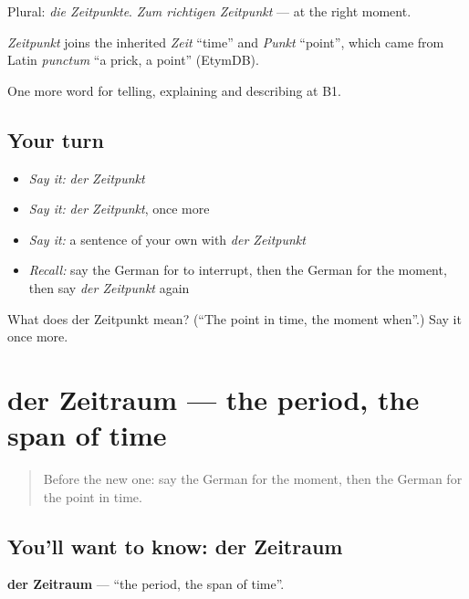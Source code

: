 Plural: \emph{die Zeitpunkte}. \emph{Zum richtigen Zeitpunkt} — at the right moment.

\begin{cousinweb}
\emph{Zeitpunkt} joins the inherited \emph{Zeit} \textquotedblleft{}time\textquotedblright{} and \emph{Punkt} \textquotedblleft{}point\textquotedblright{}, which came from Latin \emph{punctum} \textquotedblleft{}a prick, a point\textquotedblright{} (EtymDB).
\end{cousinweb}

\begin{grammarlens}[title={What you've built}]
One more word for telling, explaining and describing at B1.
\end{grammarlens}

\subsection*{Your turn}
\begin{itemize}
\raggedright
  \item \emph{Say it:} \emph{der Zeitpunkt}
  \item \emph{Say it:} \emph{der Zeitpunkt}, once more
  \item \emph{Say it:} a sentence of your own with \emph{der Zeitpunkt}
  \item \emph{Recall:} say the German for to interrupt, then the German for the moment, then say \emph{der Zeitpunkt} again
\end{itemize}

\begin{tcolorbox}[breakable,colback=teal!4,colframe=teal!35!black,title={Before you move on}]
What does der Zeitpunkt mean? (\textquotedblleft{}The point in time, the moment when\textquotedblright{}.) Say it once more.
\end{tcolorbox}
\section[der Zeitraum]{der Zeitraum — the period, the span of time}

\label{lesson:GE-C268-zeitraum}



\begin{quote}
Before the new one: say the German for the moment, then the German for the point in time.
\end{quote}

\subsection*{You'll want to know: der Zeitraum}
\textbf{der Zeitraum} — \textquotedblleft{}the period, the span of time\textquotedblright{}.

